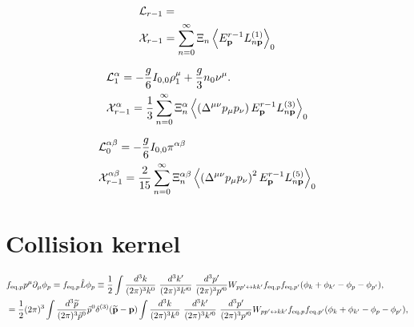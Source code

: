 \documentclass[aps,prd,preprint,nofootinbib,amsmath,amssymb,showpacs,longbibliography,singlecolumn,superscriptaddress,10pt]{revtex4-1}
\theoremstyle{plain}
\theoremstyle{definition}
\begin{document}
\begin{equation}
\begin{aligned}
&
\mathcal{L}_{r-1} 
=
\\
&     
\mathcal{X}_{r-1} 
=
\sum_{n = 0}^{\infty} \Xi_{n}
\left\langle E_{\mathbf{p}}^{r-1} L^{(1)}_{n {\bf p}} \right\rangle_{0}
\end{aligned}   
\end{equation}


\begin{equation}
\begin{aligned}
&
\mathcal{L}_{1}^{\alpha} 
=
- \frac{g}{6} I_{0,0} %
\rho_1^\mu + \frac{g}{3}n_0 \nu^\mu.
\\
&     
\mathcal{X}_{r-1}^{\alpha} 
=
\frac{1}{3}
\sum_{n = 0}^{\infty} \Xi_{n}^{\alpha}
\left\langle \left( \Delta^{\mu \nu} p_{\mu} p_{\nu} \right) E_{\mathbf{p}}^{r-1} L^{(3)}_{n {\bf p}} \right\rangle_{0}
\end{aligned}   
\end{equation}

\begin{equation}
\begin{aligned}
&
\mathcal{L}_{0}^{\alpha \beta} 
=
- \frac{g}{6} %
I_{0,0} \pi^{\alpha \beta} 
\\
&     
\mathcal{X}_{r-1}^{\alpha \beta} 
=
\frac{2}{15}
\sum_{n = 0}^{\infty} \Xi_{n}^{\alpha \beta}
\left\langle \left( \Delta^{\mu \nu} p_{\mu} p_{\nu} \right)^{2} E_{\mathbf{p}}^{r-1} L^{(5)}_{n {\bf p}} \right\rangle_{0}
\end{aligned}   
\end{equation}


\section{Collision kernel}

%
\begin{equation}
\label{Lhat}
\begin{aligned}
&
f_{\mathrm{eq},p}
p^{\mu}\partial_{\mu}\phi_p
=
f_{\mathrm{eq},p}
\hat{L}\phi_{p} 
\equiv
\frac{1}{2} \int \frac{d^{3}k}{(2 \pi)^{3} k^{0}} \ \frac{d^{3}k'}{(2 \pi)^{3} k'^{0}} \ \frac{d^{3}p'}{(2 \pi)^{3} p'^{0}}  W_{pp' \leftrightarrow kk'} f_{\mathrm{eq},p} f_{\mathrm{eq},p'} (  \phi_{k} + \phi_{k'} - \phi_{p} - \phi_{p'}  ),
\\
&
=
\frac{1}{2}(2 \pi)^{3} \int \frac{d^{3}\widetilde{p}}{(2 \pi)^{3}\Tilde{p}^{0}} \Tilde{p}^{0} \delta^{(3)}(\widetilde{\textbf{p}} - \textbf{p}) \int \frac{d^{3}k}{(2 \pi)^{3} k^{0}} \ \frac{d^{3}k'}{(2 \pi)^{3} k'^{0}} \ \frac{d^{3}p'}{(2 \pi)^{3} p'^{0}}  W_{pp' \leftrightarrow kk'} f_{\mathrm{eq},p} f_{\mathrm{eq},p'} (  \phi_{k} + \phi_{k'} - \phi_{p} - \phi_{p'}  ),
\\
&
\end{aligned}    
\end{equation}
%
\end{document}
